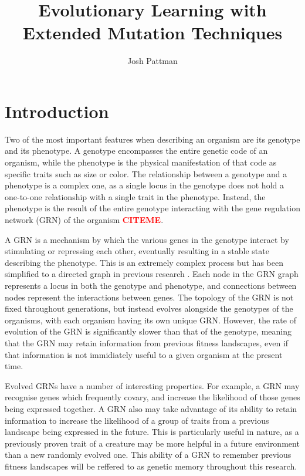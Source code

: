 \documentclass[twocolumn,a4paper,11pt]{article}
\author{Josh Pattman}
\title{Evolutionary Learning with Extended Mutation Techniques}
\newcommand{\citeme}{\textbf{\textcolor{red}{CITEME}}}
\begin{document}
	\maketitle
    \section{Introduction}
    Two of the most important features when describing an organism are its genotype and its phenotype. A genotype encompasses the entire genetic code of an organism, while the phenotype is the physical manifestation of that code as specific traits such as size or color. The relationship between a genotype and a phenotype is a complex one, as a single locus in the genotype does not hold a one-to-one relationship with a single trait in the phenotype. Instead, the phenotype is the result of the entire genotype interacting with the gene regulation network (GRN) of the organism \citeme.

    A GRN is a mechanism by which the various genes in the genotype interact by stimulating or repressing each other, eventually resulting in a stable state describing the phenotype. This is an extremely complex process but has been simplified to a directed graph in previous research \cite{original-paper}. Each node in the GRN graph represents a locus in both the genotype and phenotype, and connections between nodes represent the interactions between genes. The topology of the GRN is not fixed throughout generations, but instead evolves alongside the genotypes of the organisms, with each organism having its own unique GRN. However, the rate of evolution of the GRN is significantly slower than that of the genotype, meaning that the GRN may retain information from previous fitness landscapes, even if that information is not immidiately useful to a given organism at the present time.

    Evolved GRNs have a number of interesting properties. For example, a GRN may recognise genes which frequently covary, and increase the likelihood of those genes being expressed together. A GRN also may take advantage of its ability to retain information to increase the likelihood of a group of traits from a previous landscape being expressed in the future. This is particularly useful in nature, as a previously proven trait of a creature may be more helpful in a future environment than a new randomly evolved one. This ability of a GRN to remember previous fitness landscapes will be reffered to as genetic memory throughout this research.
\end{document}
